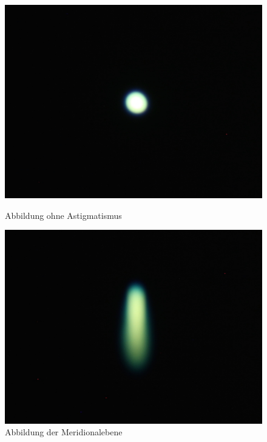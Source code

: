 \begin{figure}[htb]
	\begin{minipage}[t]{0.48\textwidth}
		\includegraphics[width=\linewidth]{img/Astigmatismus/Prakt_Linsenfehler_2015_06_04_086}
		\caption{Abbildung ohne Astigmatismus}
		\label{fig:astigmatismus_0}
	\end{minipage}
	\hfill
	\begin{minipage}[t]{0.48\textwidth}
		\includegraphics[width=\linewidth]{img/Astigmatismus/Prakt_Linsenfehler_2015_06_04_088_meridional}
		\caption{Abbildung der Meridionalebene}
		\label{fig:astigmatismus_meridional}
	\end{minipage}
	
	\vspace{0.5cm}
	

\end{figure}
